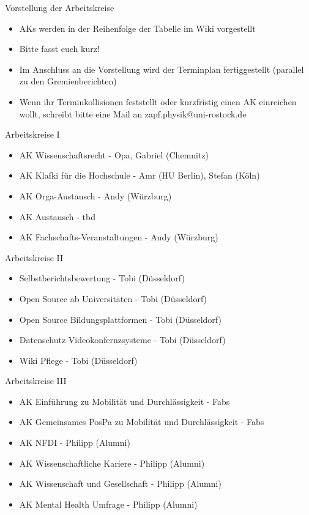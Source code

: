 \begin{frame}{Vorstellung der Arbeitskreise}
	\begin{itemize}
		\item AKs werden in der Reihenfolge der Tabelle im Wiki vorgestellt
		\item Bitte fasst euch kurz!
		\item Im Anschluss an die Vorstellung wird der Terminplan fertiggestellt (parallel zu den Gremienberichten)
		\item Wenn ihr Terminkollisionen feststellt oder kurzfristig einen AK einreichen wollt, schreibt bitte eine Mail an zapf.physik@uni-rostock.de
	\end{itemize}
\end{frame}

\begin{frame}{Arbeitskreise I}
	\begin{itemize}
		\item AK Wissenschaftsrecht - Opa, Gabriel (Chemnitz)
		\item AK Klafki für die Hochschule - Amr (HU Berlin), Stefan (Köln)
		\item AK Orga-Austausch - Andy (Würzburg)
		\item AK Austausch - tbd
		\item AK Fachschafts-Veranstaltungen - Andy (Würzburg)
	\end{itemize}
\end{frame}

\begin{frame}{Arbeitskreise II}
	\begin{itemize}
		\item Selbstberichtsbewertung - Tobi (Düsseldorf)
		\item Open Source ab Universitäten - Tobi (Düsseldorf)
		\item Open Source Bildungsplattformen - Tobi (Düsseldorf)
		\item Datenschutz Videokonfernzsysteme - Tobi (Düsseldorf)
		\item Wiki Pflege - Tobi (Düsseldorf)
	\end{itemize}
\end{frame}

\begin{frame}{Arbeitskreise III}
	\begin{itemize}
		\item AK Einführung zu Mobilität und Durchlässigkeit - Fabs
		\item AK Gemeinsames PosPa zu Mobilität und Durchlässigkeit -  Fabs
		\item AK NFDI - Philipp (Alumni)
		\item AK Wissenschaftliche Kariere - Philipp (Alumni)
		\item AK Wissenschaft und Gesellschaft - Philipp (Alumni)
		\item AK Mental Health Umfrage - Philipp (Alumni)
	\end{itemize}
\end{frame}

